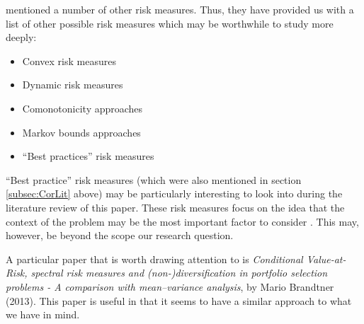 \documentclass[12pt,a4paper]{article}
\newcommand{\bi}{\begin{itemize}}
\newcommand{\ei}{\end{itemize}}
\begin{document}
\cite{dowd2006after} mentioned a number of other risk measures. Thus, they have provided us with a list of other possible risk measures which may be worthwhile to study more deeply:

\bi
\item Convex risk measures
\item Dynamic risk measures
\item Comonotonicity approaches
\item Markov bounds approaches
\item ``Best practices'' risk measures
\ei
 
``Best practice'' risk measures (which were also mentioned in section \ref{subsec:CorLit} above) may be particularly interesting to look into during the literature review of this paper. These risk measures focus on the idea that the context of the problem may be the most important factor to consider \citep{dowd2006after}. This may, however, be beyond the scope our research question.

A particular paper that is worth drawing attention to is  \textit{Conditional Value-at-Risk, spectral risk measures and (non-)diversification in portfolio selection problems - A comparison with mean–variance analysis}, by Mario Brandtner (2013). This paper is useful in that it seems to have a similar approach to what we have in mind.
\end{document}
